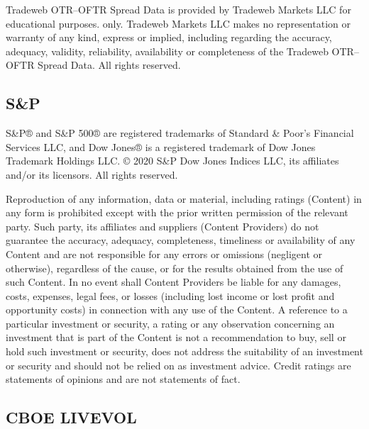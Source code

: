 \documentclass[graybox,envcountchap,sectrefs]{svmono}\usepackage[]{graphicx}\usepackage[]{xcolor}
\begin{document}
Tradeweb OTR--OFTR Spread Data is provided by Tradeweb Markets LLC
for educational purposes. only. Tradeweb Markets LLC makes no representation
or warranty of any kind, express or implied, including regarding the
accuracy, adequacy, validity, reliability, availability or completeness
of the Tradeweb OTR--OFTR Spread Data. All rights reserved.

\subsection*{S\&P}

S\&P® and S\&P 500® are registered trademarks of Standard \& Poor's
Financial Services LLC, and Dow Jones® is a registered trademark of
Dow Jones Trademark Holdings LLC. © 2020 S\&P Dow Jones Indices LLC,
its affiliates and/or its licensors. All rights reserved.

Reproduction of any information, data or material, including ratings
(\textquotedbl Content\textquotedbl ) in any form is prohibited
except with the prior written permission of the relevant party. Such
party, its affiliates and suppliers (\textquotedbl Content Providers\textquotedbl )
do not guarantee the accuracy, adequacy, completeness, timeliness
or availability of any Content and are not responsible for any errors
or omissions (negligent or otherwise), regardless of the cause, or
for the results obtained from the use of such Content. In no event
shall Content Providers be liable for any damages, costs, expenses,
legal fees, or losses (including lost income or lost profit and opportunity
costs) in connection with any use of the Content. A reference to a
particular investment or security, a rating or any observation concerning
an investment that is part of the Content is not a recommendation
to buy, sell or hold such investment or security, does not address
the suitability of an investment or security and should not be relied
on as investment advice. Credit ratings are statements of opinions
and are not statements of fact.

\subsection*{CBOE LIVEVOL}
\end{document}
